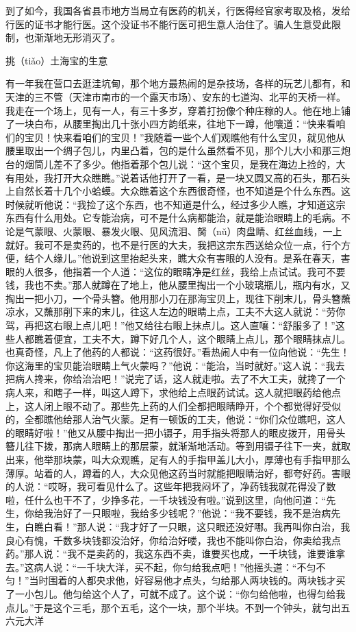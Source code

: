 \documentclass[12pt,UTF8]{ctexbook}
\begin{document}
到了如今，我国各省县市地方当局立有医药的机关，行医得经官家考取及格，发给行医的证书才能行医。这个没证书不能行医可把生意人治住了。骗人生意受此限制，也渐渐地无形消灭了。





挑（tiǎo）土海宝的生意


有一年我在营口去逛洼坑甸，那个地方最热闹的是杂技场，各样的玩艺儿都有，和天津的三不管（天津市南市的一个露天市场）、安东的七道沟、北平的天桥一样。我走在一个场上，见有一人，有三十多岁，穿着打扮像个种庄稼的人。他在地上铺了一块白布，从腰里掏出几十张小四方韵纸来，往地下一蹲，他嚷道：“快来看咱们的宝贝！快来看咱们的宝贝！”我随着一些个人们观瞧他有什么宝贝，就见他从腰里取出一个绸子包儿，内里凸着，包的是什么虽然看不见，那个儿大小和那三炮台的烟筒儿差不了多少。他指着那个包儿说：“这个宝贝，是我在海边上捡的，大有用处，我打开大众瞧瞧。”说着话他打开了一看，是一块又圆又高的石头，那石头上自然长着十几个小蛤蟆。大众瞧着这个东西很奇怪，也不知道是个什么东西。这时候就听他说：“我捡了这个东西，也不知道是什么，经过多少人瞧，才知道这宗东西有什么用处。它专能治病，可不是什么病都能治，就是能治眼睛上的毛病。不论是气蒙眼、火蒙眼、暴发火眼、见风流泪、胬（nǔ）肉盘睛、红丝血线，一上就好。我可不是卖药的，也不是行医的大夫，我把这宗东西送给众位一点，行个方便，结个人缘儿。”他说到这里抬起头来，瞧大众有害眼的人没有。是系在春天，害眼的人很多，他指着一个人道：“这位的眼睛净是红丝，我给上点试试。我可不要钱，我也不卖。”那人就蹲在了地上，他从腰里掏出一个小玻璃瓶儿，瓶内有水，又掏出一把小刀，一个骨头簪。他用那小刀在那海宝贝上，现往下削末儿，骨头簪蘸凉水，又蘸那削下来的末儿，往这人左边的眼睛上点，工夫不大这人就说：“劳你驾，再把这右眼上点儿吧！”他又给往右眼上抹点儿。这人直嚷：“舒服多了！”这些人都瞧着便宜，工夫不大，蹲下好几个人，这个眼睛上点儿，那个眼睛抹点儿。也真奇怪，凡上了他药的人都说：“这药很好。”看热闹人中有一位向他说：“先生！你这海里的宝贝能治眼睛上气火蒙吗？”他说：“能治，当时就好。”这人说：“我去把病人搀来，你给治治吧！”说完了话，这人就走啦。去了不大工夫，就搀了一个病人来，和瞎子一样，叫这人蹲下，求他给上点眼药试试。这人就把眼药给他点上，这人闭上眼不动了。那些先上药的人们全都把眼睛睁开，个个都觉得好受似的，全都瞧他给那人治气火蒙。足有一顿饭的工夫，他说：“你们众位瞧吧，这人的眼睛好啦！”他又从腰中掏出一把小镊子，用手指头将那人的眼皮拨开，用骨头簪儿往下拨，那病人眼睛上的那层蒙，就渐渐地活动。等到用镊子往下一夹，就取出来，他举那块蒙，叫大众观瞧，足有人的手指甲盖儿大小，厚薄也有手指甲那么薄厚。站着的人，蹲着的人，大众见他这药当时就能把眼睛治好，都夸好药。害眼的人说：“哎呀，我可看见什么了。这些年把我闷坏了，净药钱我就花得没了数啦，任什么也干不了，少挣多花，一千块钱没有啦。”说到这里，向他问道：“先生，你给我治好了一只眼啦，我给多少钱呢？”他说：“我不要钱，我不是治病先生，白瞧白看！”那人说：“我才好了一只眼，这只眼还没好哪。我再叫你白治，我良心有愧，千数多块钱都没治好，你给治好喽，我也不能叫你白治，你卖给我点药。”那人说：“我不是卖药的，我这东西不卖，谁要买也成，一千块钱，谁要谁拿去。”这病人说：“一千块大洋，买不起，你匀给我点吧！”他摇头道：“不匀不匀！”当时围着的人都央求他，好容易他才点头，匀给那人两块钱的。两块钱才买了一小包儿。他匀给这个人了，可就不成了。这个说：“你匀给他啦，也得匀给我点儿。”于是这个三毛，那个五毛，这个一块，那个半块。不到一个钟头，就匀出五六元大洋
\end{document}
